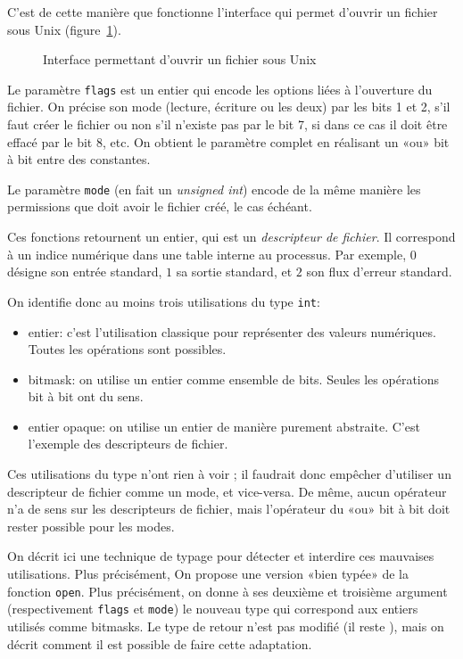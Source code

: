 C'est de cette manière que fonctionne l'interface qui permet d'ouvrir un fichier
sous Unix (figure~\ref{fig:unix-open}).

\begin{figure}
    \caption{Interface permettant d'ouvrir un fichier sous Unix}
    \label{fig:unix-open}
\end{figure}

Le paramètre \texttt{flags} est un entier qui encode les options liées à
l'ouverture du fichier. On précise son mode (lecture, écriture ou les deux) par
les bits 1 et 2, s'il faut créer le fichier ou non s'il n'existe pas par le bit
7, si dans ce cas il doit être effacé par le bit 8, etc. On obtient le paramètre
complet en réalisant un «ou» bit à bit entre des constantes.

Le paramètre \texttt{mode} (en fait un \emph{unsigned int}) encode de la même
manière les permissions que doit avoir le fichier créé, le cas échéant.

Ces fonctions retournent un entier, qui est un \emph{descripteur de fichier}. Il
correspond à un indice numérique dans une table interne au processus. Par
exemple, $0$ désigne son entrée standard, $1$ sa sortie standard, et $2$ son
flux d'erreur standard.

On identifie donc au moins trois utilisations du type \texttt{int}:

\begin{itemize}
    \item entier: c'est l'utilisation classique pour représenter des valeurs
        numériques. Toutes les opérations sont possibles.
    \item bitmask: on utilise un entier comme ensemble de bits. Seules les
        opérations bit à bit ont du sens.
    \item entier opaque: on utilise un entier de manière purement abstraite.
        C'est l'exemple des descripteurs de fichier.
\end{itemize}

Ces utilisations du type n'ont rien à voir ; il faudrait donc empêcher
d'utiliser un descripteur de fichier comme un mode, et vice-versa. De même,
aucun opérateur n'a de sens sur les descripteurs de fichier, mais l'opérateur
\texttt{\textbar{}} du «ou» bit à bit doit rester possible pour les modes.

On décrit ici une technique de typage pour détecter et interdire ces mauvaises
utilisations. Plus précisément, On propose une version «bien typée» de la
fonction \texttt{open}. Plus précisément, on donne à ses deuxième et troisième
argument (respectivement \texttt{flags} et \texttt{mode}) le nouveau type \tBits
qui correspond aux entiers utilisés comme bitmasks. Le type de retour n'est pas
modifié (il reste \tInt), mais on décrit comment il est possible de faire cette
adaptation.


